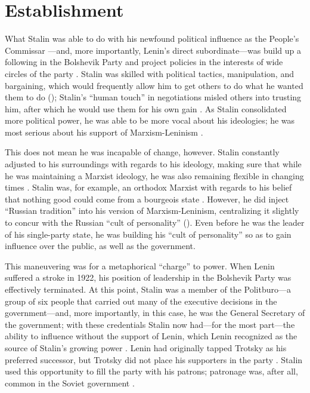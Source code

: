 \documentclass[a4paper,12pt]{article}
\begin{document}

    \section{Establishment}

        What Stalin was able to do with his newfound political influence as the People's Commissar
        ---and, more importantly, Lenin's direct subordinate---was build up a following in the
        Bolshevik Party and project policies in the interests of wide circles of the party
        \cite[3]{rigbyt}. Stalin was skilled with political tactics, manipulation, and bargaining,
        which would frequently allow him to get others to do what he wanted them to do
        (\cites[3]{rigbyt}[4]{carre}); Stalin's ``human touch'' in negotiations misled others into
        trusting him, after which he would use them for his own gain \cite[718]{kuromiyah}. As
        Stalin consolidated more political power, he was able to be more vocal about his ideologies;
        he was most serious about his support of Marxism-Leninism \cite[27]{reee}.

        This does not mean he was incapable of change, however. Stalin constantly adjusted to his
        surroundings with regards to his ideology, making sure that while he was maintaining a
        Marxist ideology, he was also remaining flexible in changing times \cite[720]{kuromiyah}.
        Stalin was, for example, an orthodox Marxist with regards to his belief that nothing good
        could come from a bourgeois state \cite[29]{reee}. However, he did inject ``Russian
        tradition'' into his version of Marxism-Leninism, centralizing it slightly to concur with
        the Russian ``cult of personality'' (\cites[23]{reee}[32]{hingleyr}). Even before he was the
        leader of his single-party state, he was building his ``cult of personality'' so as to gain
        influence over the public, as well as the government.

        This maneuvering was for a metaphorical ``charge'' to power. When Lenin suffered a stroke in
        1922, his position of leadership in the Bolshevik Party was effectively terminated. At this
        point, Stalin was a member of the Politburo---a group of six people that carried out many of
        the executive decisions in the government---and, more importantly, in this case, he was the
        General Secretary of the government; with these credentials Stalin now had---for the most
        part---the ability to influence without the support of Lenin, which Lenin recognized as the
        source of Stalin's growing power \cite[160,167]{kortm}. Lenin had originally tapped Trotsky
        as his preferred successor, but Trotsky did not place his supporters in the party
        \cite[167]{kortm}. Stalin used this opportunity to fill the party with his patrons;
        patronage was, after all, common in the Soviet government \cite[4-5]{rigbyt}.
\end{document}
